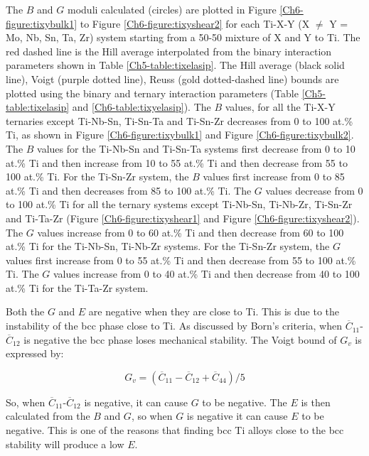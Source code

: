 The $B$ and $G$ moduli calculated (circles) are plotted in Figure \ref{Ch6-figure:tixybulk1} to Figure \ref{Ch6-figure:tixyshear2} for each Ti-X-Y (X $\neq$ Y = Mo, Nb, Sn, Ta, Zr) system starting from a 50-50 mixture of X and Y to Ti. The red dashed line is the Hill average interpolated from the binary interaction parameters shown in Table \ref{Ch5-table:tixelasip}. The Hill average (black solid line), Voigt (purple dotted line), Reuss (gold dotted-dashed line) bounds are plotted using the binary and ternary interaction parameters (Table \ref{Ch5-table:tixelasip} and \ref{Ch6-table:tixyelasip}). The $B$ values, for all the Ti-X-Y ternaries except Ti-Nb-Sn, Ti-Sn-Ta and Ti-Sn-Zr decreases from 0 to 100 at.\% Ti, as shown in Figure \ref{Ch6-figure:tixybulk1} and Figure \ref{Ch6-figure:tixybulk2}. The $B$ values for the Ti-Nb-Sn and Ti-Sn-Ta systems first decrease from 0 to 10 at.\% Ti and then increase from 10 to 55 at.\% Ti and then decrease from 55 to 100 at.\% Ti. For the Ti-Sn-Zr system, the $B$ values first increase from 0 to 85 at.\% Ti and then decreases from 85 to 100 at.\% Ti. The $G$ values decrease from 0 to 100 at.\% Ti for all the ternary systems except Ti-Nb-Sn, Ti-Nb-Zr, Ti-Sn-Zr and Ti-Ta-Zr (Figure \ref{Ch6-figure:tixyshear1} and Figure \ref{Ch6-figure:tixyshear2}). The $G$ values increase from 0 to 60 at.\% Ti and then decrease from 60 to 100 at.\% Ti for the Ti-Nb-Sn, Ti-Nb-Zr systems. For the Ti-Sn-Zr system, the $G$ values first increase from 0 to 55 at.\% Ti and then decrease from 55 to 100 at.\% Ti. The $G$ values increase from 0 to 40 at.\% Ti and then decrease from 40 to 100 at.\% Ti for the Ti-Ta-Zr system. 

Both the $G$ and $E$ are negative when they are close to Ti. This is due to the instability of the bcc phase close to Ti. As discussed by Born’s criteria, when $\overline{C}_{11}$-$\overline{C}_{12}$ is negative the bcc phase loses mechanical stability. The Voigt bound of $G_{v}$ is expressed by:

\begin{equation}
\label{eq: Gv}
G_v = \left( \overline{C}_{11}-\overline{C}_{12}+\overline{C}_{44} \right)/5
\end{equation}

So, when $\overline{C}_{11}$-$\overline{C}_{12}$ is negative, it can cause $G$ to be negative. The $E$ is then calculated from the $B$ and $G$, so when $G$ is negative it can cause $E$ to be negative. This is one of the reasons that finding bcc Ti alloys close to the bcc stability will produce a low $E$. 



